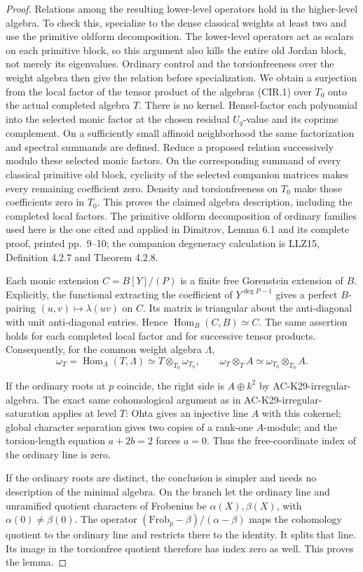 \begin{proof}
Relations among the resulting lower-level operators hold in the
higher-level algebra.  To check this, specialize to the dense
classical weights at least two and use the primitive oldform
decomposition.  The lower-level operators act as scalars on each
primitive block, so this argument also kills the entire old
Jordan block, not merely its eigenvalues.  Ordinary control and
the torsionfreeness over the weight algebra then give the relation
before specialization.  We obtain a surjection from the local
factor of the tensor product of the algebras (CIR.1) over \(T_0\)
onto the actual completed algebra \(T\).
There is no kernel.  Hensel-factor each polynomial into the
selected monic factor at the chosen residual \(U_q\)-value and
its coprime complement.  On a sufficiently small affinoid
neighborhood the same factorization and spectral summands are
defined.  Reduce a proposed relation successively modulo these
selected monic factors.  On the corresponding summand of every
classical primitive old block, cyclicity of the selected
companion matrices makes every remaining
coefficient zero.  Density and torsionfreeness on \(T_0\) make
those coefficients zero in \(T_0\).  This proves the claimed
algebra description, including the completed local factors.
The primitive oldform decomposition of ordinary families used
here is the one cited and applied in Dimitrov, Lemma 6.1 and its
complete proof, printed pp.~9--10; the companion degeneracy
calculation is LLZ15, Definition 4.2.7 and Theorem 4.2.8.

Each monic extension \(C=B[Y]/(P)\) is a finite free
Gorenstein extension of \(B\).  Explicitly, the functional
extracting the coefficient of \(Y^{\deg P-1}\) gives a perfect
\(B\)-pairing \((u,v)\mapsto\lambda(uv)\) on \(C\).
Its matrix is triangular about the anti-diagonal with unit
anti-diagonal entries.  Hence
\(\operatorname{Hom}_B(C,B)\simeq C\).
The same assertion holds for each completed local factor and
for successive tensor products.  Consequently, for the common
weight algebra \(\Lambda\),
\[
 \omega_T=\operatorname{Hom}_{\Lambda}(T,\Lambda)
       \simeq T\otimes_{T_0}\omega_{T_0},\qquad
 \omega_T\otimes_T A\simeq\omega_{T_0}\otimes_{T_0}A.  \tag{CIR.2}
\]

If the ordinary roots at \(p\) coincide, the right side is
\(A\oplus k^2\) by AC-K29-irregular-algebra.  The exact same
cohomological argument as in AC-K29-irregular-saturation applies
at level \(T\): Ohta gives an injective line \(A\) with this
cokernel; global character separation gives two copies of a
rank-one \(A\)-module; and the torsion-length equation
\(a+2b=2\) forces \(a=0\).  Thus the free-coordinate index of
the ordinary line is zero.

If the ordinary roots are distinct, the conclusion is simpler
and needs no description of the minimal algebra.  On the branch
let the ordinary line and unramified quotient characters of
Frobenius be \(\alpha(X),\beta(X)\), with
\(\alpha(0)\neq\beta(0)\).  The operator
\((\mathrm{Frob}_p-\beta)/(\alpha-\beta)\) maps the cohomology
quotient to the ordinary line and restricts there to the identity.
It splits that line.  Its image in the torsionfree quotient
therefore has index zero as well.  This proves the lemma.
\end{proof}

